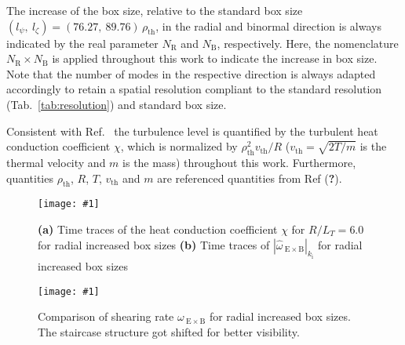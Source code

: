 \documentclass[aip, amsmath, amssymb, reprint, twocolumn]{revtex4-1}
\newcommand{\includegraphicsTwoCol}[3]{
	\begin{figure*}
    	\texttt{[image: \#1]}
		\caption{#2}
		\label{#3}
	\end{figure*}
	\increasecounter{fig}{2}
}
\newcommand{\wexb}{\omega_{\mathrm{\:E \times B}}}
\newcommand{\hatwexb}{\widehat{\omega}_{\mathrm{\:E \times B}}}
\newcommand{\NR}{N_\mathrm{R}}
\newcommand{\NB}{N_\mathrm{B}}
\newcommand{\rhoth}{\rho_\mathrm{th}}
\newcommand{\vth}{v_{\mathrm{th}}}
\begin{document}
The increase of the box size, relative to the standard box size $(l_\psi,~l_\zeta) = (76.27,~89.76)\,\rhoth$, in the radial and binormal direction is always indicated by the real parameter $\NR$ and $\NB$, respectively.
Here, the nomenclature $\NR\times \NB$ is applied throughout this work to indicate the increase in box size.  
Note that the number of modes in the respective direction is always adapted accordingly to retain a spatial resolution compliant to the standard resolution (Tab.~\ref{tab:resolution}) and standard box size.


Consistent with Ref.~\cite{peeters2016} the turbulence level is quantified by the turbulent heat conduction coefficient $\chi$, which is normalized by $\rhoth^2 \vth/R$ ($\vth = \sqrt{2 T/m}$ is the thermal velocity and $m$ is the mass) throughout this work. Furthermore, quantities $\rhoth$, $R$, $T$, $\vth$ and $m$ are referenced quantities from Ref (\textbf{?}).\bigskip




\includegraphicsTwoCol{{Comparison/Boxsize/S6_rlt6.0_boxsize1-2-3-4x1_Ns16_Nvpar48_Nmu9_comparison}.pdf}{
	\textbf{(a)} Time traces of the heat conduction coefficient $\chi$ for $R/L_T = 6.0$ for radial increased box sizes
	\textbf{(b)} Time traces of $|\hatwexb|_{k_\mathrm{i}}$ for radial increased box sizes
}{fig:wexb-eflux-1-2-3-4x1-comparison}{}

\includegraphicsTwoCol{{Comparison/Boxsize/S6_rlt6.0_boxsize1-2-3-4x1-1.5-2-2.5-3-5_Ns16_Nvpar48_Nmu9_wexb_comparison}.pdf}{
	Comparison of shearing rate $\wexb$ for radial increased box sizes. The staircase structure got 
	shifted for better visibility.
}{fig:wexb-1-2-3-4x1-stable-comparison}{}
\end{document}
